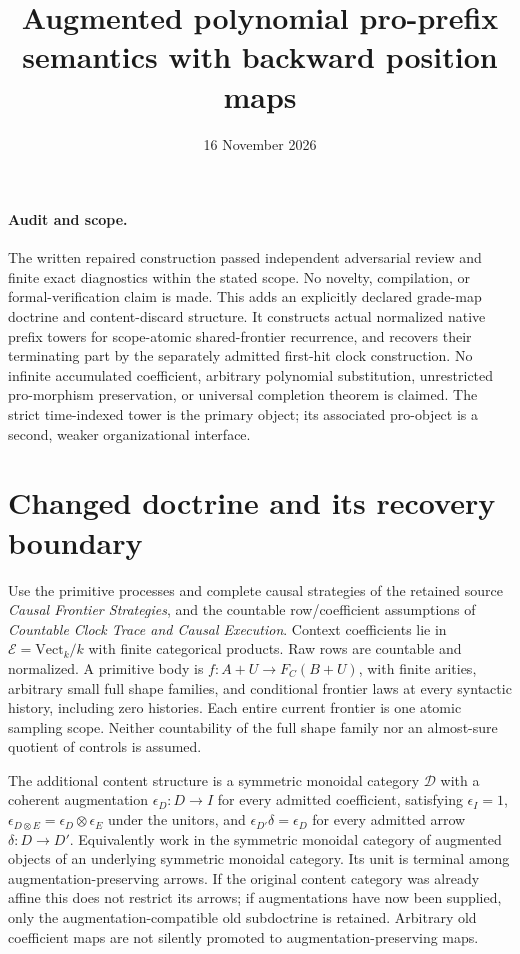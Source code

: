 \documentclass[11pt]{article}
\title{Augmented polynomial pro-prefix semantics with backward position maps}
\date{16 November 2026}
\newcommand{\E}{\mathcal E}
\begin{document}
\maketitle
\paragraph{Audit and scope.} The written repaired construction passed independent adversarial review and finite exact diagnostics within the stated scope. No novelty, compilation, or formal-verification claim is made. This adds an explicitly declared grade-map doctrine and content-discard structure. It constructs actual normalized native prefix towers for scope-atomic shared-frontier recurrence, and recovers their terminating part by the separately admitted first-hit clock construction. No infinite accumulated coefficient, arbitrary polynomial substitution, unrestricted pro-morphism preservation, or universal completion theorem is claimed. The strict time-indexed tower is the primary object; its associated pro-object is a second, weaker organizational interface.

\section{Changed doctrine and its recovery boundary}
Use the primitive processes and complete causal strategies of the retained source \emph{Causal Frontier Strategies}, and the countable row/coefficient assumptions of \emph{Countable Clock Trace and Causal Execution}. Context coefficients lie in $\E=\mathrm{Vect}_k/k$ with finite categorical products. Raw rows are countable and normalized. A primitive body is $f:A+U\to F_C(B+U)$, with finite arities, arbitrary small full shape families, and conditional frontier laws at every syntactic history, including zero histories. Each entire current frontier is one atomic sampling scope. Neither countability of the full shape family nor an almost-sure quotient of controls is assumed.

The additional content structure is a symmetric monoidal category $\mathcal D$ with a coherent augmentation $\epsilon_D:D\to I$ for every admitted coefficient, satisfying $\epsilon_I=1$, $\epsilon_{D\otimes E}=\epsilon_D\otimes\epsilon_E$ under the unitors, and $\epsilon_{D'}\delta=\epsilon_D$ for every admitted arrow $\delta:D\to D'$. Equivalently work in the symmetric monoidal category of augmented objects of an underlying symmetric monoidal category. Its unit is terminal among augmentation-preserving arrows. If the original content category was already affine this does not restrict its arrows; if augmentations have now been supplied, only the augmentation-compatible old subdoctrine is retained. Arbitrary old coefficient maps are not silently promoted to augmentation-preserving maps.
\end{document}
